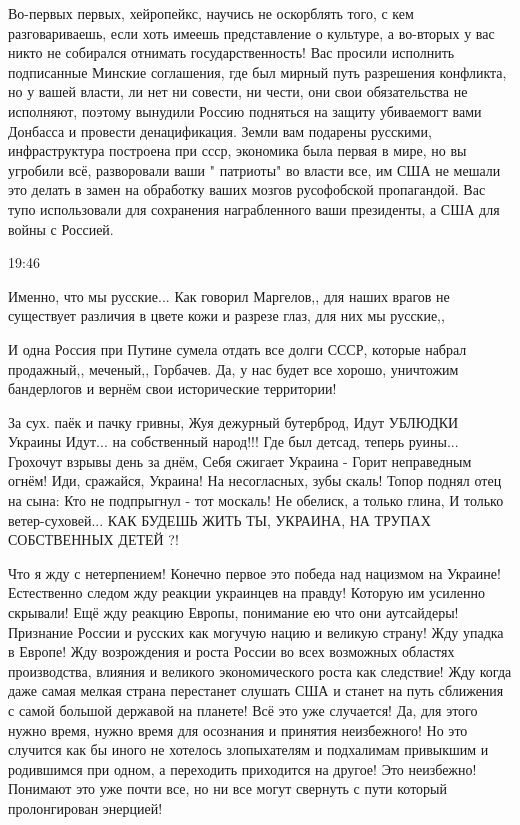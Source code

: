 
Во-первых первых, хейропейкс, научись не оскорблять того, с кем разговариваешь,
если хоть имеешь представление о культуре, а во-вторых у вас никто не собирался
отнимать государственность! Вас просили исполнить подписанные Минские
соглашения, где был мирный путь разрешения конфликта, но у вашей власти, ли нет
ни совести, ни чести, они свои обязательства не исполняют, поэтому вынудили
Россию подняться на защиту убиваемогт вами Донбасса и провести денацификация.
Земли вам подарены русскими, инфраструктура построена при ссср, экономика была
первая в мире, но вы угробили всё, разворовали ваши " патриоты" во власти все,
им США не мешали это делать в замен на обработку ваших мозгов русофобской
пропагандой. Вас тупо использовали для сохранения награбленного ваши
президенты, а США для войны с Россией.

19:46

Именно, что мы русские... Как говорил Маргелов,, для наших врагов не существует
различия в цвете кожи и разрезе глаз, для них мы русские,,

И одна Россия при Путине сумела отдать все долги СССР, которые набрал
продажный,, меченый,, Горбачев. Да, у нас будет все хорошо, уничтожим
бандерлогов и вернём свои исторические территории!


За сух. паёк и пачку гривны,
Жуя дежурный бутерброд,
Идут УБЛЮДКИ Украины
Идут... на собственный народ!!!
Где был детсад, теперь руины...
Грохочут взрывы день за днём,
Себя сжигает Украина -
Горит неправедным огнём!
Иди, сражайся, Украина!
На несогласных, зубы скаль!
Топор поднял отец на сына:
Кто не подпрыгнул - тот москаль!
Не обелиск, а только глина,
И только ветер-суховей...
КАК БУДЕШЬ ЖИТЬ ТЫ, УКРАИНА,
НА ТРУПАХ СОБСТВЕННЫХ ДЕТЕЙ ?!


Что я жду с нетерпением! Конечно первое это победа над нацизмом на Украине!
Естественно следом жду реакции украинцев на правду! Которую им усиленно
скрывали! Ещё жду реакцию Европы, понимание ею что они аутсайдеры! Признание
России и русских как могучую нацию и великую страну! Жду упадка в Европе! Жду
возрождения и роста России во всех возможных областях производства, влияния и
великого экономического роста как следствие! Жду когда даже самая мелкая страна
перестанет слушать США и станет на путь сближения с самой большой державой на
планете! Всё это уже случается! Да, для этого нужно время, нужно время для
осознания и принятия неизбежного! Но это случится как бы иного не хотелось
злопыхателям и подхалимам привыкшим и родившимся при одном, а переходить
приходится на другое! Это неизбежно! Понимают это уже почти все, но ни все
могут свернуть с пути который пролонгирован энерцией!

